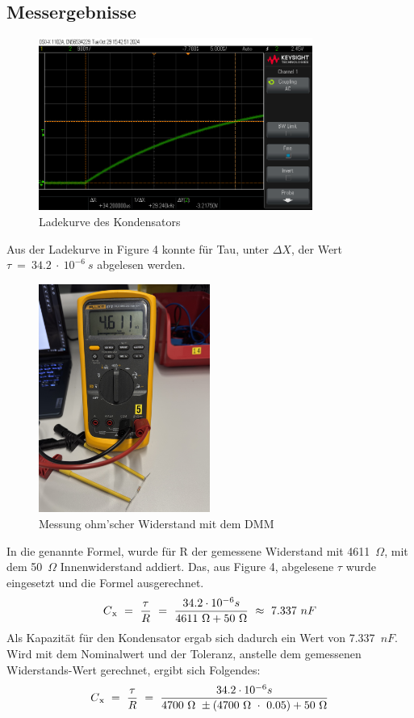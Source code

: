 \documentclass[a4paper,12pt]{article}
\begin{document}
\subsection{Messergebnisse}

\begin{figure}[H]
    \centering
    \includegraphics[width=0.8\textwidth]{../Quellen/Labor2/scope_1.png}
\caption{Ladekurve des Kondensators}
\end{figure}
Aus der Ladekurve in Figure 4 konnte für Tau, unter $\Delta X$, der Wert \(\tau~=~34.2~\cdot~10^{-6}~s\) abgelesen werden.\\

\begin{figure}[H]
    \centering
    \includegraphics[width=0.5\textwidth]{../Quellen/Labor2/Fotos/IMG_3963gezoomt.jpeg}
\caption{Messung ohm'scher Widerstand mit dem DMM}
\end{figure}

\noindent In die genannte Formel, wurde für R der gemessene Widerstand mit 4611~$\Omega$, mit dem 50~$\Omega$ Innenwiderstand addiert. Das, aus Figure 4, abgelesene $\tau$ wurde eingesetzt und die Formel ausgerechnet.
\[
C\textsubscript{x} ~=~ \frac{\tau}{R} ~=~ \frac{34.2 \cdot 10^{-6}s}{4611~\Omega + 50~\Omega} ~\approx~ 7.337~nF
\]
\noindent Als Kapazität für den Kondensator ergab sich dadurch ein Wert von 7.337~$nF$.\\
Wird mit dem Nominalwert und der Toleranz, anstelle dem gemessenen Widerstands-Wert gerechnet, ergibt sich Folgendes:
\[
C\textsubscript{x} ~=~ \frac{\tau}{R} ~=~ \frac{34.2 \cdot 10^{-6}s}{4700~\Omega~\pm(4700~\Omega~\cdot~0.05) + 50~\Omega}
\]
\end{document}
